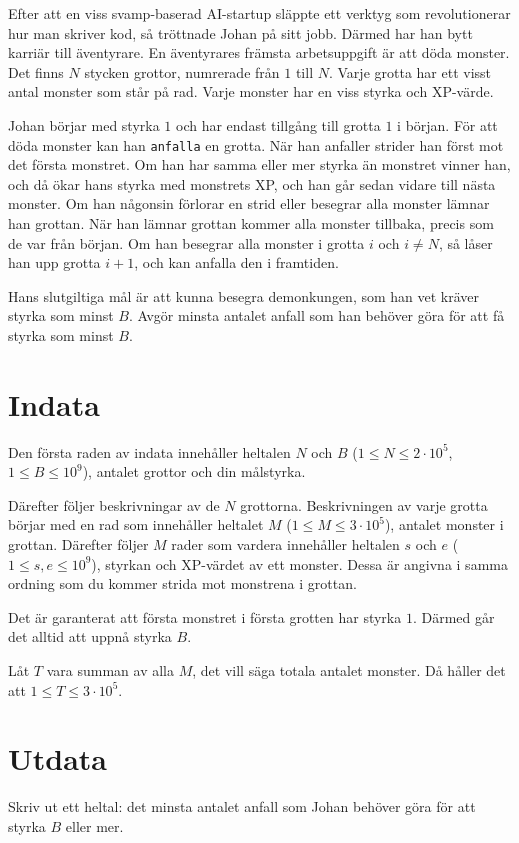 \noindent

Efter att en viss svamp-baserad AI-startup släppte ett verktyg som revolutionerar hur man skriver kod, så tröttnade Johan på sitt jobb.
Därmed har han bytt karriär till äventyrare.
En äventyrares främsta arbetsuppgift är att döda monster.
Det finns $N$ stycken grottor, numrerade från $1$ till $N$.
Varje grotta har ett visst antal monster som står på rad.
Varje monster har en viss styrka och XP-värde.

Johan börjar med styrka $1$ och har endast tillgång till grotta $1$ i början.
För att döda monster kan han \texttt{anfalla} en grotta.
När han anfaller strider han först mot det första monstret.
Om han har samma eller mer styrka än monstret vinner han, och då ökar hans styrka med monstrets XP, och han går sedan vidare till nästa monster.
Om han någonsin förlorar en strid eller besegrar alla monster lämnar han grottan.
När han lämnar grottan kommer alla monster tillbaka, precis som de var från början.
Om han besegrar alla monster i grotta $i$ och $i \neq N$, så låser han upp grotta $i+1$, och kan anfalla den i framtiden.

Hans slutgiltiga mål är att kunna besegra demonkungen, som han vet kräver styrka som minst $B$.
Avgör minsta antalet anfall som han behöver göra för att få styrka som minst $B$.

\section*{Indata}
Den första raden av indata innehåller heltalen $N$ och $B$ ($1 \leq N \leq 2 \cdot 10^5$, $1 \leq B \leq 10^9$),
antalet grottor och din målstyrka.

Därefter följer beskrivningar av de $N$ grottorna.
Beskrivningen av varje grotta börjar med en rad som innehåller heltalet $M$ ($1 \leq M \leq 3 \cdot 10^5$), antalet monster i grottan.
Därefter följer $M$ rader som vardera innehåller heltalen $s$ och $e$ ($1 \leq s,e \leq 10^9$),
styrkan och XP-värdet av ett monster.
Dessa är angivna i samma ordning som du kommer strida mot monstrena i grottan.

Det är garanterat att första monstret i första grotten har styrka $1$.
Därmed går det alltid att uppnå styrka $B$.

Låt $T$ vara summan av alla $M$, det vill säga totala antalet monster. Då håller det att $1 \leq T \leq 3 \cdot 10^5$.

\section*{Utdata}
Skriv ut ett heltal: det minsta antalet anfall som Johan behöver göra för att styrka $B$ eller mer.

